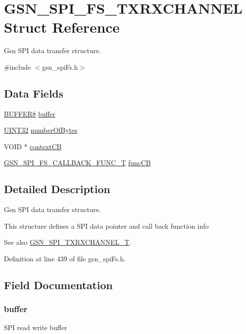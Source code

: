 \hypertarget{a00237}{
\section{GSN\_\-SPI\_\-FS\_\-TXRXCHANNEL Struct Reference}
\label{a00237}
}


Gsn SPI data transfer structure.  




{\ttfamily \#include $<$gsn\_\-spiFs.h$>$}

\subsection*{Data Fields}
\begin{DoxyCompactItemize}
\item 
\hyperlink{a00006}{BUFFER8} \hyperlink{a00237_a1941d7a126e0456900f127bbe67adfe0}{buffer}
\item 
\hyperlink{a00660_gae1e6edbbc26d6fbc71a90190d0266018}{UINT32} \hyperlink{a00237_aa38439c1a3431e9af92418009b525efa}{numberOfBytes}
\item 
VOID $\ast$ \hyperlink{a00237_a2898b010839acbc30fb49ec89189292c}{contextCB}
\item 
\hyperlink{a00655_gaa58c26aaa273da2e8ff41d1833d1147e}{GSN\_\-SPI\_\-FS\_\-CALLBACK\_\-FUNC\_\-T} \hyperlink{a00237_a506259129a056fa472fce11e8ad5421f}{funcCB}
\end{DoxyCompactItemize}


\subsection{Detailed Description}
Gsn SPI data transfer structure. 

This structure defines a SPI data pointer and call back function info

\begin{DoxySeeAlso}{See also}
\hyperlink{a00655_ga0cdbeb0b657e6192938aebc1aaf793de}{GSN\_\-SPI\_\-TXRXCHANNEL\_\-T}. 
\end{DoxySeeAlso}


Definition at line 439 of file gsn\_\-spiFs.h.



\subsection{Field Documentation}
\hypertarget{a00237_a1941d7a126e0456900f127bbe67adfe0}{
\subsubsection[{buffer}]{ {\bf buffer}}}
\label{a00237_a1941d7a126e0456900f127bbe67adfe0}
SPI read write buffer 

